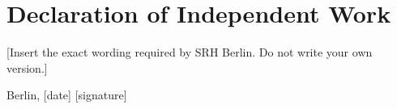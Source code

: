 \chapter*{Declaration of Independent Work}
[Insert the exact wording required by SRH Berlin. Do not write your own version.]

\vspace{2cm}
Berlin, [date] \hfill [signature]
